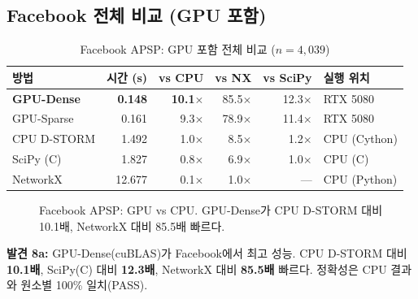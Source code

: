 \documentclass[11pt,a4paper]{article}
\begin{document}
\subsection{Facebook 전체 비교 (GPU 포함)}

\begin{table}[ht]\centering
\caption{Facebook APSP: GPU 포함 전체 비교 ($n\!=\!4{,}039$)}
\begin{tabular}{@{}lrrrrl@{}}
\toprule
\textbf{방법} & \textbf{시간 (s)} & \textbf{vs CPU} & \textbf{vs NX} & \textbf{vs SciPy} & \textbf{실행 위치} \\
\midrule
\textbf{GPU-Dense} & \textbf{0.148} & \textbf{10.1$\times$} & 85.5$\times$ & 12.3$\times$ & RTX 5080 \\
GPU-Sparse & 0.161 & 9.3$\times$ & 78.9$\times$ & 11.4$\times$ & RTX 5080 \\
CPU D-STORM & 1.492 & 1.0$\times$ & 8.5$\times$ & 1.2$\times$ & CPU (Cython) \\
SciPy (C) & 1.827 & 0.8$\times$ & 6.9$\times$ & 1.0$\times$ & CPU (C) \\
NetworkX & 12.677 & 0.1$\times$ & 1.0$\times$ & --- & CPU (Python) \\
\bottomrule
\end{tabular}
\end{table}

\begin{figure}[ht]
\centering
{}
\caption{Facebook APSP: GPU vs CPU. GPU-Dense가 CPU D-STORM 대비 10.1배, NetworkX 대비 85.5배 빠르다.}
\label{fig:fb-gpu}
\end{figure}

\textbf{발견 8a:} GPU-Dense(cuBLAS)가 Facebook에서 최고 성능. CPU D-STORM 대비 \textbf{10.1배}, SciPy(C) 대비 \textbf{12.3배}, NetworkX 대비 \textbf{85.5배} 빠르다. 정확성은 CPU 결과와 원소별 100\% 일치(PASS).
\end{document}
